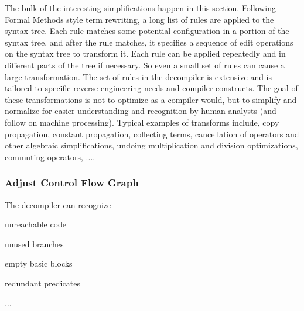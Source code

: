 The bulk of the interesting simplifications happen in this section. Following Formal Methods style term rewriting, a long list of rules are applied to the syntax tree. Each rule matches some potential configuration in a portion of the syntax tree, and after the rule matches, it specifies a sequence of edit operations on the syntax tree to transform it. Each rule can be applied repeatedly and in different parts of the tree if necessary. So even a small set of rules can cause a large transformation. The set of rules in the decompiler is extensive and is tailored to specific reverse engineering needs and compiler constructs. The goal of these transformations is not to optimize as a compiler would, but to simplify and normalize for easier understanding and recognition by human analysts (and follow on machine processing). Typical examples of transforms include, copy propagation, constant propagation, collecting terms, cancellation of operators and other algebraic simplifications, undoing multiplication and division optimizations, commuting operators, ....\hypertarget{index_step5e}{}\subsubsection{Adjust Control Flow Graph}\label{index_step5e}
The decompiler can recognize
\begin{DoxyItemize}
\item unreachable code
\item unused branches
\item empty basic blocks
\item redundant predicates
\item ...
\end{DoxyItemize}

